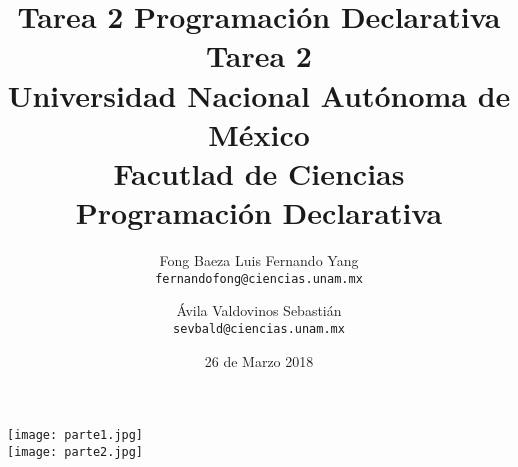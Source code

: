 \documentclass[11pt,letterpaper]{article}
\title{Tarea 2 Programación Declarativa}
\begin{document}
\title{\vspace{-1.5cm}
	Tarea 2\\
    \large Universidad Nacional Autónoma de México\\
    Facutlad de Ciencias\\
    Programación Declarativa\\
}
\author{
	Fong Baeza Luis Fernando Yang\\
    \texttt{fernandofong@ciencias.unam.mx}
    \and 
    Ávila Valdovinos Sebastián\\
    \texttt{sevbald@ciencias.unam.mx}
    }
\date{26 de Marzo 2018}
\maketitle
\texttt{[image: parte1.jpg]}\\
\texttt{[image: parte2.jpg]}
\end{document}
